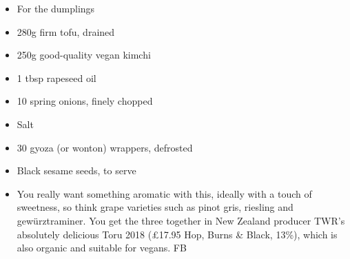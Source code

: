 \documentclass{book}
\begin{document}
\begin{itemize}
\item For the dumplings
\item 280g firm tofu, drained
\item 250g good-quality vegan kimchi 
\item 1 tbsp rapeseed oil 
\item 10 spring onions, finely chopped 
\item Salt
\item 30 gyoza (or wonton) wrappers, defrosted 
\item Black sesame seeds, to serve
\end{itemize}

\begin{itemize}
\item You really want something aromatic with this, ideally with a touch of sweetness, so think grape varieties such as pinot gris, riesling and gewürztraminer. You get the three together in New Zealand producer TWR’s absolutely delicious Toru 2018 (£17.95 Hop, Burns \& Black, 13\%), which is also organic and suitable for vegans. FB
\end{itemize}
\end{document}
